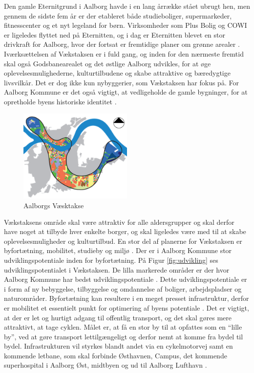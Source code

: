\newline \indent{     }  Den gamle Eternitgrund i Aalborg havde i en lang årrække stået ubrugt hen, men gennem de sidste fem år er der etableret både studieboliger, supermarkeder, fitnesscenter og et nyt legeland for børn. Virksomheder som Plus Bolig og COWI er ligeledes flyttet ned på Eternitten, og i dag er Eternitten blevet en stor drivkraft for Aalborg,  hvor der fortsat  er fremtidige planer om grønne arealer \citep{eternitten}.
\newline \indent{     }  Iværksættelsen af Vækstaksen er i fuld gang, og inden for den nærmeste fremtid skal også Godsbanearealet og det østlige Aalborg udvikles, for at øge oplevelsesmulighederne, kulturtilbudene og skabe attraktive og bæredygtige livsvilkår. Det er dog ikke kun nybyggerier, som Vækstaksen har fokus på. For Aalborg Kommune er det også vigtigt, at vedligeholde de gamle bygninger, for at opretholde byens historiske identitet \citep{kommuneplan3}.

\begin{figure}[htbp]
	\centering
	\includegraphics[width=0.5\textwidth]{billeder/vaekstaksen.png}
	\caption{Aalborgs Væsktakse \citep{kommuneplan3}}
	\label{fig:vaekstakse}
\end{figure}

Vækstaksens område skal være attraktiv for alle aldersgrupper og skal derfor have noget at tilbyde hver enkelte borger, og skal ligeledes være med til at skabe oplevelsesmuligheder og kulturtilbud.
\newline \indent{     }  En stor del af planerne for Vækstaksen er byfortætning, mobilitet, studieby og miljø \citep{kommuneplan3}. 
Der er i Aalborg Kommune stor udviklingspotentiale inden for byfortætning. På Figur \ref{fig:udvikling} ses udviklingspotentialet i Vækstaksen. De lilla markerede områder er der hvor Aalborg Kommune har bedst udviklingspotentiale \citep{kommuneplan3}.
\newline \indent{     }  Dette udviklingspotentiale er i form af ny bebyggelse, tilbyggelse og omdannelse af boliger, arbejdspladser og naturområder. Byfortætning kan resultere i en meget presset infrastruktur, derfor er mobilitet et essentielt punkt for optimering af byens potentiale \citep{kommuneplan3}. Det er vigtigt, at der er let og hurtigt adgang til offentlig transport, og det skal gøres mere attraktivt, at tage cyklen. Målet er, at få en stor by til at opfattes som en “lille by”, ved at gøre transport lettilgængeligt og derfor nemt at komme fra bydel til bydel. Infrastrukturen vil styrkes blandt andet via en cykelmotorvej samt en kommende letbane, som skal forbinde Østhavnen, Campus, det kommende superhospital i Aalborg Øst, midtbyen og ud til Aalborg Lufthavn \citep{kommuneplan3}.

